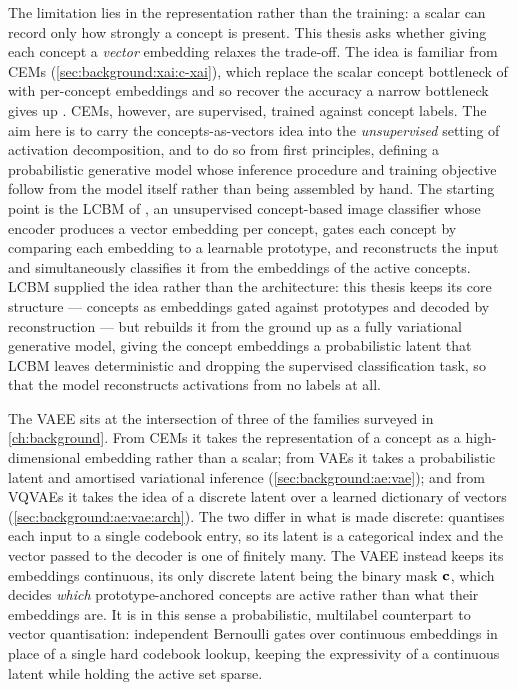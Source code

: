 The limitation lies in the representation rather than the training: a scalar can
record only how strongly a concept is present. This thesis asks whether giving
each concept a \textit{vector} embedding relaxes the trade-off. The idea is
familiar from \acp{CEM}
(\cref{sec:background:xai:c-xai}), which
replace the scalar concept bottleneck of  with per-concept embeddings
and so recover the accuracy a narrow bottleneck gives up
\citep{espinosazarlengaConceptEmbeddingModels2022}. \Acp{CEM}, however, are
supervised, trained against concept labels. The aim here is to carry the
concepts-as-vectors idea into the \textit{unsupervised} setting of activation
decomposition, and to do so from first principles, defining a probabilistic
generative model whose inference procedure and training objective follow from
the model itself rather than being assembled by hand. The starting point is the
\ac{LCBM} of \citet{desantisBetterGeneralizationInterpretability2025}, an
unsupervised concept-based image classifier whose encoder produces a vector
embedding per concept, gates each concept by comparing each embedding to a
learnable prototype, and reconstructs the input and simultaneously classifies it
from the embeddings of the active concepts. \Ac{LCBM} supplied the idea rather
than the architecture: this thesis keeps its core structure --- concepts as
embeddings gated against prototypes and decoded by reconstruction --- but
rebuilds it from the ground up as a fully variational generative model, giving
the concept embeddings a probabilistic latent that \ac{LCBM} leaves
deterministic and dropping the supervised classification task, so that the model
reconstructs activations from no labels at all.

The \ac{VAEE} sits at the intersection of three of the families surveyed in
\cref{ch:background}. From \acp{CEM}
it takes the representation of a concept as a high-dimensional embedding rather
than a scalar; from \acp{VAE} it takes a probabilistic latent and amortised
variational inference
(\cref{sec:background:ae:vae});
and from \acp{VQVAE} it takes the idea of a discrete latent over a learned
dictionary of vectors
(\cref{sec:background:ae:vae:arch}). The
two differ in what is made discrete:  quantises each input to a
single codebook entry, so its latent is a categorical index and the vector
passed to the decoder is one of finitely many. The \ac{VAEE} instead keeps its
embeddings continuous, its only discrete latent being the binary mask $\vb{c}$,
which decides \textit{which} prototype-anchored concepts are active rather than
what their embeddings are. It is in this sense a probabilistic, multilabel
counterpart to vector quantisation: independent Bernoulli gates over continuous
embeddings in place of a single hard codebook lookup, keeping the expressivity
of a continuous latent while holding the active set sparse.

